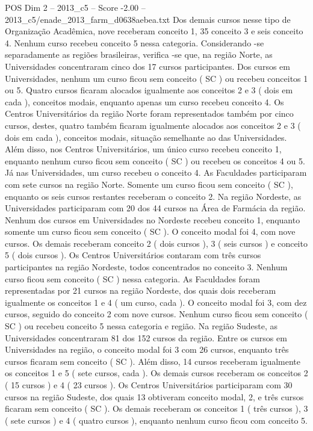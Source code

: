 \begin{textsample}{POS Dim 2 – 2013\_c5 – Score -2.00 – 2013\_c5/enade\_2013\_farm\_d0638aebea.txt}
Dos demais cursos nesse tipo de Organização Acadêmica, nove receberam conceito 1, 35 conceito 3 e seis conceito 4.
Nenhum curso recebeu conceito 5 nessa categoria.
Considerando -se separadamente as regiões brasileiras, verifica -se que, na região Norte, as Universidades concentraram cinco dos 17 cursos participantes.
Dos cursos em Universidades, nenhum um curso ficou sem conceito ( SC ) ou recebeu conceitos 1 ou 5.
Quatro cursos ficaram alocados igualmente aos conceitos 2 e 3 ( dois em cada ), conceitos modais, enquanto apenas um curso recebeu conceito 4.
Os Centros Universitários da região Norte foram representados também por cinco cursos, destes, quatro também ficaram igualmente alocados aos conceitos 2 e 3 ( dois em cada ), conceitos modais, situação semelhante ao das Universidades.
Além disso, nos Centros Universitários, um único curso recebeu conceito 1, enquanto nenhum curso ficou sem conceito ( SC ) ou recebeu os conceitos 4 ou 5.
Já nas Universidades, um curso recebeu o conceito 4.
As Faculdades participaram com sete cursos na região Norte.
Somente um curso ficou sem conceito ( SC ), enquanto os seis cursos restantes receberam o conceito 2.
Na região Nordeste, as Universidades participaram com 20 dos 44 cursos na Área de Farmácia da região.
Nenhum dos cursos em Universidades no Nordeste recebeu conceito 1, enquanto somente um curso ficou sem conceito ( SC ).
O conceito modal foi 4, com nove cursos.
Os demais receberam conceito 2 ( dois cursos ), 3 ( seis cursos ) e conceito 5 ( dois cursos ).
Os Centros Universitários contaram com três cursos participantes na região Nordeste, todos concentrados no conceito 3.
Nenhum curso ficou sem conceito ( SC ) nessa categoria.
As Faculdades foram representadas por 21 cursos na região Nordeste, dos quais dois receberam igualmente os conceitos 1 e 4 ( um curso, cada ).
O conceito modal foi 3, com dez cursos, seguido do conceito 2 com nove cursos.
Nenhum curso ficou sem conceito ( SC ) ou recebeu conceito 5 nessa categoria e região.
Na região Sudeste, as Universidades concentraram 81 dos 152 cursos da região.
Entre os cursos em Universidades na região, o conceito modal foi 3 com 26 cursos, enquanto três cursos ficaram sem conceito ( SC ).
Além disso, 14 cursos receberam igualmente os conceitos 1 e 5 ( sete cursos, cada ).
Os demais cursos receberam os conceitos 2 ( 15 cursos ) e 4 ( 23 cursos ).
Os Centros Universitários participaram com 30 cursos na região Sudeste, dos quais 13 obtiveram conceito modal, 2, e três cursos ficaram sem conceito ( SC ).
Os demais receberam os conceitos 1 ( três cursos ), 3 ( sete cursos ) e 4 ( quatro cursos ), enquanto nenhum curso ficou com conceito 5.

\end{textsample}
